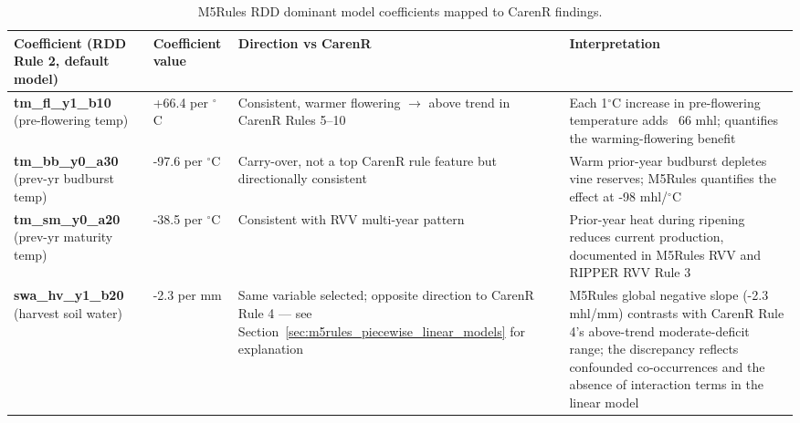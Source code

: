 \begin{table}[!ht]
  \centering
  \caption{M5Rules RDD dominant model coefficients mapped to CarenR findings.}\label{tab:ch4a_7}
  \footnotesize
  \begin{adjustbox}{max width=\textwidth}
    \begin{tabularx}{\textwidth}{p{2.8cm}|p{1.5cm}|p{3.5cm}|X}
  \toprule
  Coefficient (RDD Rule 2, default model) & Coefficient value & Direction vs CarenR & Interpretation \\
  \midrule
  \textbf{tm\_fl\_y1\_b10} \newline (pre-flowering temp) & +66.4 \newline per $^\circ$C & Consistent, warmer flowering $\rightarrow$ above trend in CarenR Rules 5--10 & Each 1$^\circ$C increase in pre-flowering temperature adds ~66 mhl; quantifies the warming-flowering benefit \\
  \textbf{tm\_bb\_y0\_a30} \newline (prev-yr budburst temp) & -97.6 \newline per $^\circ$C & Carry-over, not a top CarenR rule feature but directionally consistent & Warm prior-year budburst depletes vine reserves; M5Rules quantifies the effect at -98 mhl/$^\circ$C \\
  \textbf{tm\_sm\_y0\_a20} \newline (prev-yr maturity temp) & -38.5 \newline per $^\circ$C & Consistent with RVV multi-year pattern & Prior-year heat during ripening reduces current production, documented in M5Rules RVV and RIPPER RVV Rule 3 \\
  \textbf{swa\_hv\_y1\_b20} \newline (harvest soil water) & -2.3 \newline per mm & Same variable selected; opposite direction to CarenR Rule 4 --- see Section~\ref{sec:m5rules_piecewise_linear_models} for explanation & M5Rules global negative slope (-2.3 mhl/mm) contrasts with CarenR Rule 4's above-trend moderate-deficit range; the discrepancy reflects confounded co-occurrences and the absence of interaction terms in the linear model \\
  \bottomrule
\end{tabularx}
  \end{adjustbox}

\end{table}


